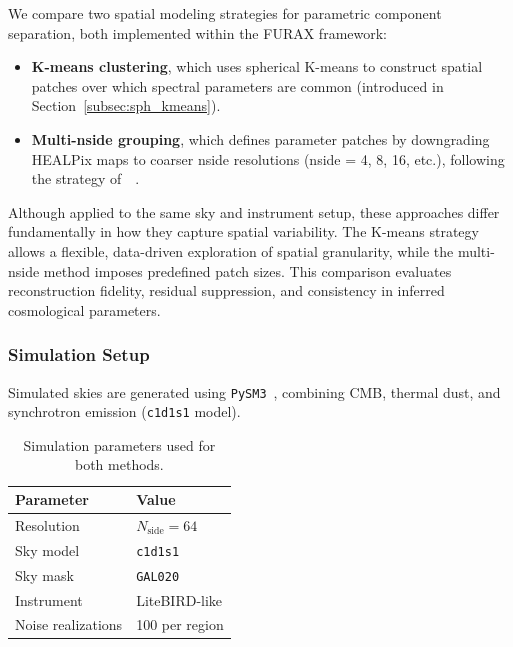 \documentclass[fleqn,usenatbib]{mnras}
\begin{document}
We compare two spatial modeling strategies for parametric component separation, both implemented within the \textsc{FURAX} framework:
\begin{itemize}
    \item \textbf{K-means clustering}, which uses spherical K-means to construct spatial patches over which spectral parameters are common (introduced in Section~\ref{subsec:sph_kmeans}).
    \item \textbf{Multi-nside grouping}, which defines parameter patches by downgrading HEALPix maps to coarser nside resolutions (nside = 4, 8, 16, etc.), following the strategy of~\citep{LiteBIRD_PTEP_2022}~\citep{ERRAR18}.
\end{itemize}

Although applied to the same sky and instrument setup, these approaches differ fundamentally in how they capture spatial variability. The K-means strategy allows a flexible, data-driven exploration of spatial granularity, while the multi-nside method imposes predefined patch sizes. This comparison evaluates reconstruction fidelity, residual suppression, and consistency in inferred cosmological parameters.

\subsubsection*{Simulation Setup}

Simulated skies are generated using \texttt{PySM3}~\citep{Zonca_2021,Thorne_2017}, combining CMB, thermal dust, and synchrotron emission (\texttt{c1d1s1} model).

\begin{table}
    \centering
    \small
    \caption{Simulation parameters used for both methods.}
    \label{tab:comparison_sim}
    \begin{tabular}{@{}p{3.5cm}|p{5cm}@{}}
        \toprule
        \textbf{Parameter} & \textbf{Value} \\
        \midrule
        Resolution & \( N_{\text{side}} = 64 \) \\
        Sky model & \texttt{c1d1s1} \\
        Sky mask & \texttt{GAL020} \\
        Instrument & LiteBIRD-like \\
        Noise realizations & 100 per region \\
        \bottomrule
    \end{tabular}
\end{table}
\end{document}
